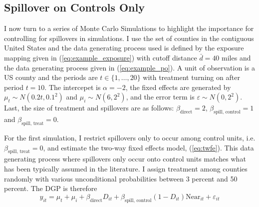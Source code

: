 \documentclass[11pt]{article}
\begin{document}
\subsection{Spillover on Controls Only}

I now turn to a series of Monte Carlo Simulations to highlight the importance for controlling for spillovers in simulations. I use the set of counties in the contiguous United States and the data generating process used is defined by the exposure mapping given in (\ref{eq:example_exposure}) with cutoff distance $\bar{d} = 40$ miles and the data generating process given in (\ref{eq:example_po}). A unit of observation is a US county and the periods are $t \in \{1, \dots, 20\}$ with treatment turning on after period $t = 10$. The intercepet is $\alpha = -2$, the fixed effects are generated by $\mu_t \sim N(0.2t, 0.1^2)$ and $\mu_i \sim N(6, 2^2)$, and the error term is $\varepsilon \sim N(0, 2^2)$. Last, the size of treatment and spillovers are as follows: $\beta_{\text{direct}} = 2$, $\beta_{\text{spill, control}} = 1$ and $\beta_{\text{spill, treat}} = 0$.

For the first simulation, I restrict spillovers only to occur among control units, i.e. $\beta_{\text{spill, treat}} = 0$, and estimate the two-way fixed effects model, (\ref{eq:twfe}). This data generating process where spillovers only occur onto control units matches what has been typically assumed in the literature. I assign treatment among counties randomly with various unconditional probabilities between 3 percent and 50 percent. The DGP is therefore 
\begin{equation}
    \label{eq:dgp1} 
    y_{it} = \mu_t + \mu_i + \beta_{\text{direct}} D_{it} + \beta_{\text{spill, control}} (1-D_{it}) \text{Near}_{it} + \varepsilon_{it}   
\end{equation}
\end{document}

